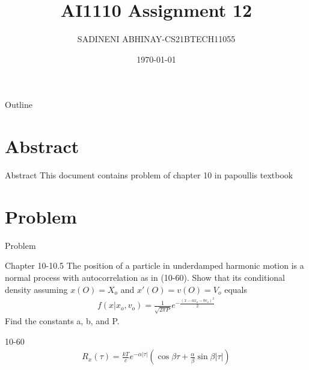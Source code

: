 \documentclass{beamer}
\title{AI1110 Assignment 12}
\author{SADINENI ABHINAY-CS21BTECH11055 }
\date{\today}
\providecommand{\brak}[1]{\ensuremath{\left(#1\right)}}
\begin{document}
\newcommand{\BEQA}{\begin{eqnarray}}
\newcommand{\EEQA}{\end{eqnarray}}
\newcommand{\define}{\stackrel{\triangle}{=}}
\newcommand*\circled[1]{\tikz[baseline=(char.base)]{
    \node[shape=circle,draw,inner sep=2pt] (char) {#1};}}

	\begin{frame}
		\titlepage
	\end{frame}
\begin{frame}{Outline}
\tableofcontents
\end{frame}

\section{Abstract}
\begin{frame}{Abstract}
This document contains problem of chapter 10 in papoullis textbook
\end{frame}
\section{Problem}
\begin{frame}{Problem}
\begin{block}{Chapter 10-10.5}
The position of a particle in underdamped harmonic motion is a normal process with
autocorrelation as in (10-60).  Show that its conditional density assuming $x(O) = X_o$ and
$x'(O) = v(O) = V_o$ equals
\begin{align}
f\brak{x|x_o , v_o} = \frac{1}{\sqrt{2\pi P}}e^{-\frac{\brak{x-ax_o-bv_o}^2}{2}}
\end{align}
Find the  constants a, b, and P. 
\end{block}
\begin{block}{10-60}
\begin{align}
R_{x}(\tau)=\frac{k T}{c} e^{-\alpha|\tau|}\left(\cos \beta \tau+\frac{\alpha}{\beta} \sin \beta|\tau|\right)
\end{align}
\end{block}
\end{frame}
\end{document}
